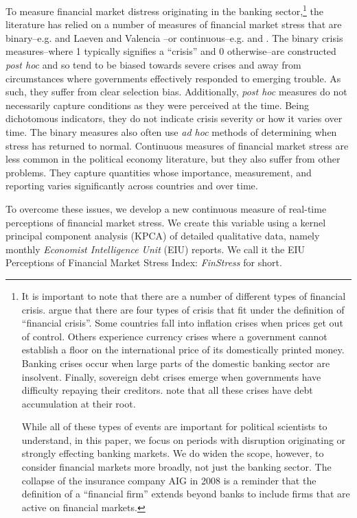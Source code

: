 \documentclass[]{article}
\begin{document}
To measure financial market distress originating in the banking sector,\footnote{It is important to note that there are a number of different types of financial crisis. \cite{reinhartRogoff2011} argue that there are four types of crisis that fit under the definition of ``financial crisis''. Some countries fall into inflation crises when prices get out of control. Others experience currency crises where a government cannot establish a floor on the international price of its domestically printed money. Banking crises occur when large parts of the domestic banking sector are insolvent.  Finally, sovereign debt crises emerge when governments have difficulty repaying their creditors. \citeauthor{reinhartRogoff2011} note that all these crises have debt accumulation at their root.

While all of these types of events are important for political scientists to understand, in this paper, we focus on periods with disruption originating or strongly effecting banking markets. We do widen the scope, however, to consider financial markets more broadly, not just the banking sector. The collapse of the insurance company AIG in 2008 is a reminder that the definition of a ``financial firm'' extends beyond banks to include firms that are active on financial markets.} the literature has relied on a number of measures of financial market stress that are binary--e.g. \cite{Reinhart2009,ReinhartRog2010} and Laeven and Valencia \citeyearpar[and their predecessors]{laeven2013}--or continuous--e.g. \cite{Lepetit2013} and \cite{Andrianova2015}. The binary crisis measures--where 1 typically signifies a ``crisis'' and 0 otherwise--are constructed \textit{post hoc} and so tend to be biased towards severe crises and away from circumstances where governments effectively responded to emerging trouble. As such, they suffer from clear selection bias. Additionally, \textit{post hoc} measures do not necessarily capture conditions as they were perceived at the time. Being dichotomous indicators, they do not indicate crisis severity or how it varies over time. The binary measures also often use \textit{ad hoc} methods of determining when stress has returned to normal. Continuous measures of financial market stress are less common in the political economy literature, but they also suffer from other problems. They capture quantities whose importance, measurement, and reporting varies significantly across countries and over time.

To overcome these issues, we develop a new continuous measure of real-time perceptions of financial market stress. We create this variable using a kernel principal component analysis (KPCA) of detailed qualitative data, namely monthly \emph{Economist Intelligence Unit} (EIU) reports. We call it the EIU Perceptions of Financial Market Stress Index: \emph{FinStress} for short.
\end{document}
